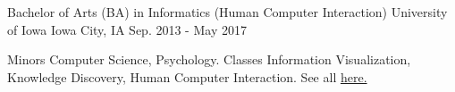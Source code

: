 \begin{cventries}
  \cventry
    {Bachelor of Arts (BA) in Informatics (Human Computer Interaction)}
    {University of Iowa}
    {Iowa City, IA}
    {Sep. 2013 - May 2017}
    {
      \begin{cvitemED}
          \cvskillED
            {Minors}
            {Computer Science, Psychology.}
          \cvskillED
            {Classes}
            {Information Visualization, Knowledge Discovery, Human Computer Interaction. See all \href{https://www.github.com/ryan-p-larson/college-sankey/}{here.}}
      \end{cvitemED}
    }
\end{cventries}
